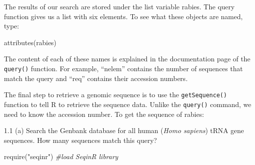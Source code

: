 \documentclass[
]{article}
\newenvironment{Shaded}{\begin{snugshade}}{\end{snugshade}}
\newcommand{\CommentTok}[1]{\textcolor[rgb]{0.56,0.35,0.01}{\textit{#1}}}
\newcommand{\DecValTok}[1]{\textcolor[rgb]{0.00,0.00,0.81}{#1}}
\newcommand{\FunctionTok}[1]{\textcolor[rgb]{0.00,0.00,0.00}{#1}}
\newcommand{\NormalTok}[1]{#1}
\newcommand{\OtherTok}[1]{\textcolor[rgb]{0.56,0.35,0.01}{#1}}
\newcommand{\SpecialCharTok}[1]{\textcolor[rgb]{0.00,0.00,0.00}{#1}}
\newcommand{\StringTok}[1]{\textcolor[rgb]{0.31,0.60,0.02}{#1}}
\begin{document}
The results of our search are stored under the list variable rabies. The
query function gives us a list with six elements. To see what these
objects are named, type:

\begin{Shaded}
\begin{Highlighting}[]
\FunctionTok{attributes}\NormalTok{(rabies)}
\end{Highlighting}
\end{Shaded}

The content of each of these names is explained in the documentation
page of the \texttt{query()} function. For example, ``nelem'' contains
the number of sequences that match the query and ``req'' contains their
accession numbers.

\begin{Shaded}
\end{Shaded}

\begin{Shaded}
\end{Shaded}

The final step to retrieve a genomic sequence is to use the
\texttt{getSequence()} function to tell R to retrieve the sequence data.
Unlike the \texttt{query()} command, we need to know the accession
number. To get the sequence of rabies:

\begin{Shaded}
\end{Shaded}

1.1 (a) Search the Genbank database for all human (\emph{Homo sapiens})
tRNA gene sequences. How many sequences match this query? \span

\begin{Shaded}
\begin{Highlighting}[]
\FunctionTok{require}\NormalTok{(}\StringTok{"seqinr"}\NormalTok{) }\CommentTok{\#load SeqinR library}
\end{Highlighting}
\end{Shaded}
\end{document}
